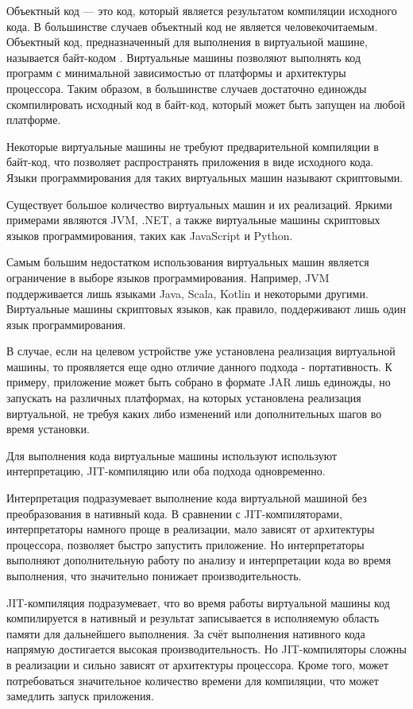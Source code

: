 Объектный код — это код, который является результатом компиляции исходного кода.
В большинстве случаев объектный код не является человекочитаемым.
Объектный код, предназначенный для выполнения в виртуальной машине, называется байт-кодом \cite{BytecodeDefentition}.
Виртуальные машины позволяют выполнять код программ с минимальной зависимостью от платформы и архитектуры процессора.
Таким образом, в большинстве случаев достаточно единожды скомпилировать исходный код в байт-код, который может быть запущен на любой платформе.

Некоторые виртуальные машины не требуют предварительной компиляции в байт-код, что позволяет распространять приложения в виде исходного кода.
Языки программирования для таких виртуальных машин называют скриптовыми.

Существует большое количество виртуальных машин и их реализаций.
Яркими примерами являются JVM, .NET, а также виртуальные машины скриптовых языков программирования, таких как JavaScript и Python.

Самым большим недостатком использования виртуальных машин является ограничение в выборе языков программирования. 
Например, JVM поддерживается лишь языками Java, Scala, Kotlin и некоторыми другими. 
Виртуальные машины скриптовых языков, как правило, поддерживают лишь один язык программирования.

В случае, если на целевом устройстве уже установлена реализация виртуальной машины, то проявляется еще одно отличие данного подхода - портативность. 
К примеру, приложение может быть собрано в формате JAR лишь единожды, но запускать на различных платформах, на которых установлена реализация виртуальной, не требуя каких либо изменений или дополнительных шагов во время установки.

Для выполнения кода виртуальные машины используют используют интерпретацию, JIT-компиляцию или оба подхода одновременно.

Интерпретация подразумевает выполнение кода виртуальной машиной без преобразования в нативный кода. 
В сравнении с JIT-компиляторами, интерпретаторы намного проще в реализации, мало зависят от архитектуры процессора, позволяет быстро запустить приложение.
Но интерпретаторы выполняют дополнительную работу по анализу и интерпретации кода во время выполнения, что значительно понижает производительность.

JIT-компиляция подразумевает, что во время работы виртуальной машины код компилируется в нативный и результат записывается в исполняемую область памяти для дальнейшего выполнения.
За счёт выполнения нативного кода напрямую достигается высокая производительность.
Но JIT-компиляторы сложны в реализации и сильно зависят от архитектуры процессора.
Кроме того, может потребоваться значительное количество времени для компиляции, что может замедлить запуск приложения.


